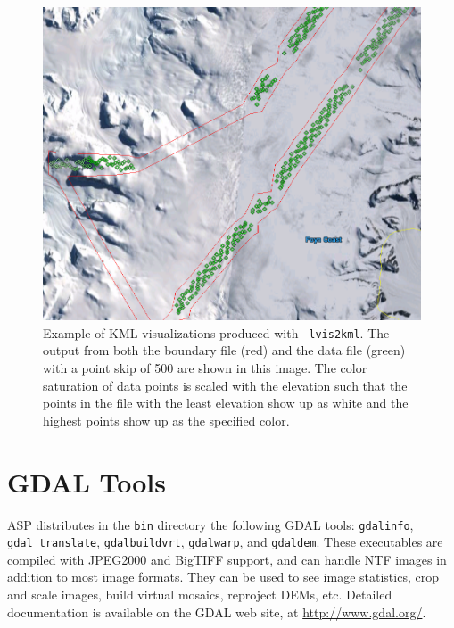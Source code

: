\begin{figure}[!b]
  \begin{center}
  \includegraphics[width=6in]{images/lvis2kml_snap.png}
  \end{center}
  \caption{ Example of \ac{KML} visualizations produced with {\tt
      lvis2kml}.  The output from both the boundary file (red) and the data file
      (green) with a point skip of 500 are shown in this image.  The color saturation of
      data points is scaled with the elevation such that the points in the file with the least
      elevation show up as white and the highest points show up as the specified color.}
  \label{fig:lvis2kml_example}
\end{figure}


\section{GDAL Tools}

ASP distributes in the \texttt{bin} directory the following GDAL tools:
\texttt{gdalinfo}, \texttt{gdal\_translate}, \texttt{gdalbuildvrt}, \texttt{gdalwarp}, 
and \texttt{gdaldem}.
These executables are compiled with
JPEG2000 and BigTIFF support, and can handle NTF images in addition to
most image formats.  They can be used to see image statistics, crop and
scale images, build virtual mosaics, reproject DEMs, etc. Detailed
documentation is available on the GDAL web site, at
\url{http://www.gdal.org/}.
